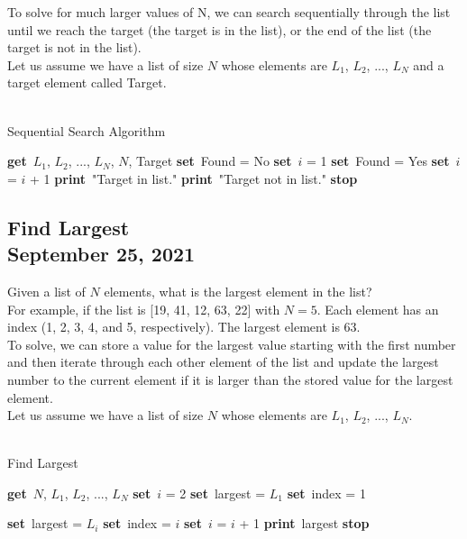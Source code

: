 \documentclass[]{article}
\newcommand{\Get}{\State \textbf{get}~}
\newcommand{\Set}{\State \textbf{set}~}
\newcommand{\Print}{\State \textbf{print}~}
\newcommand{\Stop}{\State \textbf{stop}~}
\begin{document}
To solve for much larger values of N, we can search sequentially through the list until we reach the target (the target is in the list), or the end of the list (the target is not in the list).\\

Let us assume we have a list of size $N$ whose elements are $L_1$, $L_2$, ..., $L_N$ and a target element called Target.

\begin{algorithm}
	\caption{\\Sequential Search Algorithm}
	\begin{algorithmic}[1]
		\Get $L_1$, $L_2$, ..., $L_N$, $N$, Target
		\Set Found = No
		\Set $i$ = 1
				\Set Found = Yes
			\Else
				\Set $i$ = $i$ + 1
			\EndIf
		\EndWhile
			\Print "Target in list."
		\Else
			\Print "Target not in list."
		\EndIf
		\Stop
	\end{algorithmic}
\end{algorithm}

\subsection{Find Largest\\ {\normalfont September 25, 2021}}
\bigbreak

Given a list of $N$ elements, what is the largest element in the list?\\

For example, if the list is [19, 41, 12, 63, 22] with $N = 5$. Each element has an index (1, 2, 3, 4, and 5, respectively). The largest element is 63.\\

To solve, we can store a value for the largest value starting with the first number and then iterate through each other element of the list and update the largest number to the current element if it is larger than the stored value for the largest element.\\

Let us assume we have a list of size $N$ whose elements are $L_1$, $L_2$, ..., $L_N$.

\begin{algorithm}
	\caption{\\Find Largest}
	\begin{algorithmic}[1]
		\Get $N$, $L_1$, $L_2$, ..., $L_N$
		\Set $i$ = 2
		\Set largest = $L_1$
		\Set index = 1
	\end{algorithmic}
\end{algorithm}
\begin{algorithm}
	\begin{algorithmic}[1]
				\Set largest = $L_i$
				\Set index = $i$
			\EndIf
			\Set $i$ = $i$ + 1
		\EndWhile
		\Print largest
		\Stop
	\end{algorithmic}
\end{algorithm}
\end{document}
